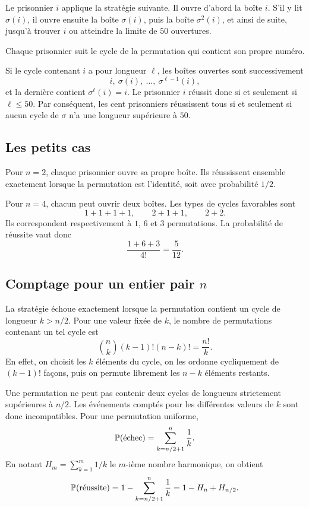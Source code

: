 \documentclass[11pt,a4paper]{article}
\begin{document}
Le prisonnier $i$ applique la stratégie suivante. Il ouvre d'abord la boîte
$i$. S'il y lit $\sigma(i)$, il ouvre ensuite la boîte $\sigma(i)$, puis la
boîte $\sigma^2(i)$, et ainsi de suite, jusqu'à trouver $i$ ou atteindre la
limite de $50$ ouvertures.

\begin{keyideabox}
Chaque prisonnier suit le cycle de la permutation qui contient son propre
numéro.
\end{keyideabox}

Si le cycle contenant $i$ a pour longueur $\ell$, les boîtes ouvertes sont
successivement
\[
i,\ \sigma(i),\ \ldots,\ \sigma^{\ell-1}(i),
\]
et la dernière contient
$\sigma^\ell(i)=i$. Le prisonnier $i$ réussit donc si et seulement si
$\ell\leq 50$. Par conséquent, les cent prisonniers réussissent tous si et
seulement si aucun cycle de $\sigma$ n'a une longueur supérieure à $50$.

\subsection*{Les petits cas}

Pour $n=2$, chaque prisonnier ouvre sa propre boîte. Ils réussissent ensemble
exactement lorsque la permutation est l'identité, soit avec probabilité
$1/2$.

Pour $n=4$, chacun peut ouvrir deux boîtes. Les types de cycles favorables
sont
\[
1+1+1+1,\qquad 2+1+1,\qquad 2+2.
\]
Ils correspondent respectivement à $1$, $6$ et $3$ permutations. La
probabilité de réussite vaut donc
\[
\frac{1+6+3}{4!}=\frac{5}{12}.
\]

\subsection*{Comptage pour un entier pair $n$}

La stratégie échoue exactement lorsque la permutation contient un cycle de
longueur $k>n/2$. Pour une valeur fixée de $k$, le nombre de permutations
contenant un tel cycle est
\[
\binom nk (k-1)!(n-k)!=\frac{n!}{k}.
\]
En effet, on choisit les $k$ éléments du cycle, on les ordonne cycliquement de
$(k-1)!$ façons, puis on permute librement les $n-k$ éléments restants.

Une permutation ne peut pas contenir deux cycles de longueurs strictement
supérieures à $n/2$. Les événements comptés pour les différentes valeurs de
$k$ sont donc incompatibles. Pour une permutation uniforme,
\[
\mathbb P(\text{échec})
=\sum_{k=n/2+1}^{n}\frac1k.
\]
En notant $H_m=\sum_{k=1}^m 1/k$ le $m$-ième nombre harmonique, on obtient
\[
\mathbb P(\text{réussite})
=1-\sum_{k=n/2+1}^{n}\frac1k
=1-H_n+H_{n/2}.
\]
\end{document}
